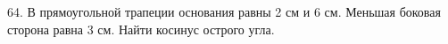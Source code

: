 64. В прямоугольной трапеции основания равны 2 см и 6 см. Меньшая боковая сторона равна 3 см. Найти косинус острого угла.\\
